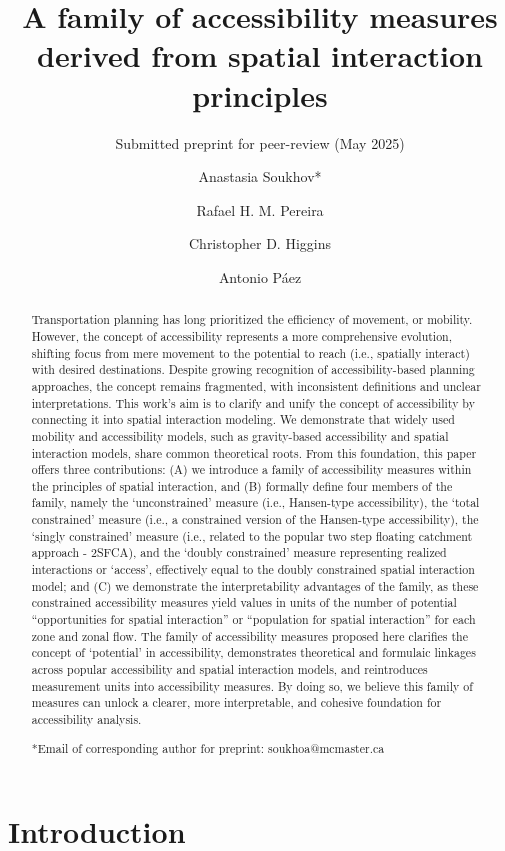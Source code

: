 \documentclass[
]{article}
\title{A family of accessibility measures derived from spatial
interaction principles}
\subtitle{Submitted preprint for peer-review (May 2025)}
\author{Anastasia Soukhov* \and Rafael H. M. Pereira \and Christopher D.
Higgins \and Antonio Páez}
\date{}
\begin{document}
\maketitle
\begin{abstract}
Transportation planning has long prioritized the efficiency of movement,
or mobility. However, the concept of accessibility represents a more
comprehensive evolution, shifting focus from mere movement to the
potential to reach (i.e., spatially interact) with desired destinations.
Despite growing recognition of accessibility-based planning approaches,
the concept remains fragmented, with inconsistent definitions and
unclear interpretations. This work's aim is to clarify and unify the
concept of accessibility by connecting it into spatial interaction
modeling. We demonstrate that widely used mobility and accessibility
models, such as gravity-based accessibility and spatial interaction
models, share common theoretical roots. From this foundation, this paper
offers three contributions: (A) we introduce a family of accessibility
measures within the principles of spatial interaction, and (B) formally
define four members of the family, namely the `unconstrained' measure
(i.e., Hansen-type accessibility), the `total constrained' measure
(i.e., a constrained version of the Hansen-type accessibility), the
`singly constrained' measure (i.e., related to the popular two step
floating catchment approach - 2SFCA), and the `doubly constrained'
measure representing realized interactions or `access', effectively
equal to the doubly constrained spatial interaction model; and (C) we
demonstrate the interpretability advantages of the family, as these
constrained accessibility measures yield values in units of the number
of potential ``opportunities for spatial interaction'' or ``population
for spatial interaction'' for each zone and zonal flow. The family of
accessibility measures proposed here clarifies the concept of
`potential' in accessibility, demonstrates theoretical and formulaic
linkages across popular accessibility and spatial interaction models,
and reintroduces measurement units into accessibility measures. By doing
so, we believe this family of measures can unlock a clearer, more
interpretable, and cohesive foundation for accessibility analysis.

*Email of corresponding author for preprint: soukhoa@mcmaster.ca
\end{abstract}

\section{Introduction}\label{introduction}
\end{document}
